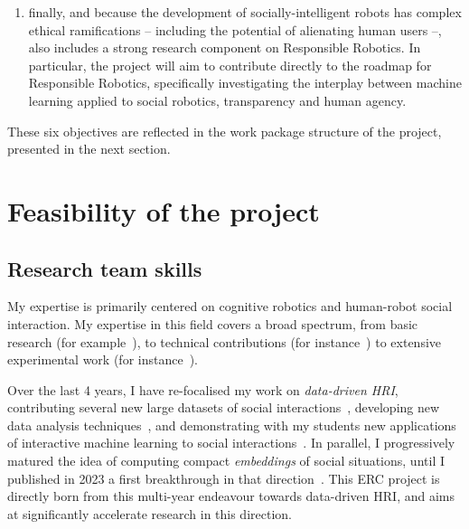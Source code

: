 \begin{enumerate}[label=\textbf{O\arabic*}]
    \item \label{T6} finally, and because the development of
        socially-intelligent robots has complex ethical ramifications --
        including the potential of alienating human users --, \project also
        includes a strong research component on Responsible Robotics. In
        particular, the project will aim to contribute directly to the roadmap
        for Responsible Robotics, specifically investigating the interplay between
        machine learning applied to social robotics, transparency and human agency.

\end{enumerate}

These six objectives are reflected in the work package structure of the project,
presented in the next section.


\section{Feasibility of the project}


\subsection{Research team skills}
\label{research-team}

My expertise is primarily centered on cognitive robotics and human-robot social
interaction. My expertise in this field covers a broad spectrum, from basic
research (for
example~\cite{lemaignan2014dynamics,lemaignan2015mutual,irfan2018social,winkle2019effective,bartlett2019what}),
to technical contributions (for instance~\cite{lemaignan2010oro,
lemaignan2017artificial, lemaignan2018underworlds})
to extensive experimental work (for instance~\cite{hood2015cowriter,winkle2020couch,
lemaignan2022social}).

Over the last 4 years, I have re-focalised my work on \emph{data-driven HRI},
contributing several new large datasets of social
interactions~\cite{lemaignan2018pinsoro,sallami2020unexpected,webb2023sogrin},
developing new data analysis
techniques~\cite{bartlett2019what,webb2022measuring}, and demonstrating with my
students new applications of interactive machine learning to social
interactions~\cite{senft2016sparc,winkle2020couch,winkle2021leador}.
In parallel, I progressively matured the idea of computing compact
\emph{embeddings} of social situations, until I published in 2023 a first
breakthrough in that direction~\cite{lemaignan2024social}. This ERC project is
directly born from this multi-year endeavour towards data-driven HRI, and aims
at significantly accelerate research in this direction.

